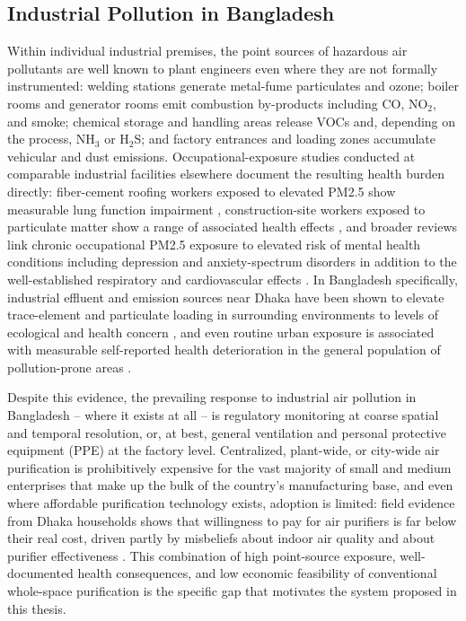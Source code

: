 \subsection{Industrial Pollution in Bangladesh}
\label{sec:industrial-pollution-bd}

Within individual industrial premises, the point sources of hazardous air pollutants are well known to plant engineers even where they are not formally instrumented: welding stations generate metal-fume particulates and ozone; boiler rooms and generator rooms emit combustion by-products including CO, NO$_2$, and smoke; chemical storage and handling areas release VOCs and, depending on the process, NH$_3$ or H$_2$S; and factory entrances and loading zones accumulate vehicular and dust emissions. Occupational-exposure studies conducted at comparable industrial facilities elsewhere document the resulting health burden directly: fiber-cement roofing workers exposed to elevated PM2.5 show measurable lung function impairment \citep{nasri2023pm25}, construction-site workers exposed to particulate matter show a range of associated health effects \citep{sekhavati2023particulate}, and broader reviews link chronic occupational PM2.5 exposure to elevated risk of mental health conditions including depression and anxiety-spectrum disorders in addition to the well-established respiratory and cardiovascular effects \citep{alhadhrami2024pm25mental}. In Bangladesh specifically, industrial effluent and emission sources near Dhaka have been shown to elevate trace-element and particulate loading in surrounding environments to levels of ecological and health concern \citep{lisa2025investigative}, and even routine urban exposure is associated with measurable self-reported health deterioration in the general population of pollution-prone areas \citep{rahman2025perceived}.

Despite this evidence, the prevailing response to industrial air pollution in Bangladesh -- where it exists at all -- is regulatory monitoring at coarse spatial and temporal resolution, or, at best, general ventilation and personal protective equipment (PPE) at the factory level. Centralized, plant-wide, or city-wide air purification is prohibitively expensive for the vast majority of small and medium enterprises that make up the bulk of the country's manufacturing base, and even where affordable purification technology exists, adoption is limited: field evidence from Dhaka households shows that willingness to pay for air purifiers is far below their real cost, driven partly by misbeliefs about indoor air quality and about purifier effectiveness \citep{chowdhury2025misbeliefs}. This combination of high point-source exposure, well-documented health consequences, and low economic feasibility of conventional whole-space purification is the specific gap that motivates the system proposed in this thesis.

